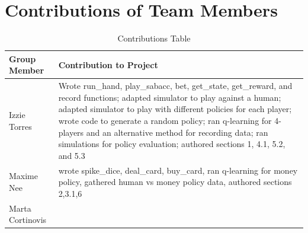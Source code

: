 \documentclass{article}
\begin{document}
\section*{Contributions of Team Members}
\begin{table}[H]
    \begin{center}
    \caption{Contributions Table}
    \begin{tabular}{ | p{1in} | p{5in}| } 
        \hline
        \textbf{Group Member} & \textbf{Contribution to Project} \\  \hline
        Izzie Torres & Wrote run\_hand, play\_sabacc, bet, get\_state, get\_reward, and record functions; adapted simulator to play against a human; adapted simulator to play with different policies for each player; wrote code to generate a random policy; ran q-learning for 4-players and an alternative method for recording data; ran simulations for policy evaluation; authored sections 1, 4.1, 5.2, and 5.3 \\ \hline
        Maxime Nee & wrote spike\_dice, deal\_card, buy\_card, ran q-learning for money policy, gathered human vs money policy data, authored sections 2,3.1,6\\ \hline
        Marta Cortinovis & \\ \hline
    \end{tabular}
    \end{center}
\end{table}

\end{document}
